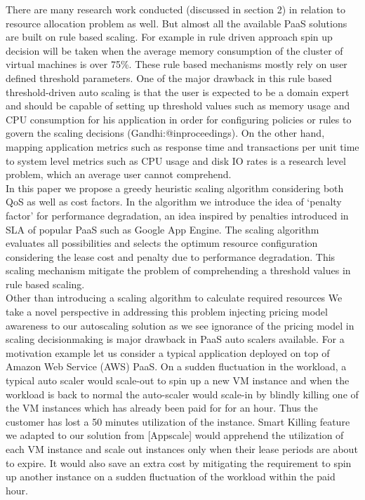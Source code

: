 There are many research work conducted (discussed in section 2) in relation to resource allocation problem as well. But almost all the available PaaS solutions are built on rule based scaling. For example in rule driven approach spin up decision will be taken when the average memory consumption of the cluster of virtual machines is over 75\%. These rule based mechanisms mostly rely on user defined threshold parameters. One of the major drawback in this rule based threshold-driven auto scaling is that the user is expected to be a domain expert and should be capable of setting up threshold values such as memory usage and CPU consumption for his application in order for configuring policies or rules to govern the scaling decisions (Gandhi:@inproceedings). On the other hand, mapping application metrics such as response time and transactions per unit time to system level metrics such as CPU usage and disk IO rates is a research level problem, which an average user cannot comprehend. \\

In this paper we propose a greedy heuristic scaling algorithm considering both QoS as well as cost factors. In the algorithm we introduce the idea of ‘penalty factor’ for performance degradation, an idea inspired by penalties introduced in SLA of popular PaaS such as Google App Engine. The scaling algorithm evaluates all possibilities and selects the optimum resource configuration considering the lease cost and penalty due to performance degradation. This scaling mechanism mitigate the problem of comprehending a threshold values in rule based scaling. \\

Other than introducing a scaling algorithm to calculate  required resources We take a novel perspective in addressing this problem injecting pricing model awareness to our autoscaling solution as we see ignorance of the pricing model in scaling decisionmaking  is major drawback in PaaS auto scalers available. For a motivation example let us consider a typical application deployed on top of Amazon Web Service (AWS) PaaS. On a sudden fluctuation in the workload, a typical auto scaler would scale-out to spin up a new VM instance and when the workload is back to normal the auto-scaler would scale-in by blindly killing one of the VM instances which has already been paid for for an hour. Thus the customer has lost a 50 minutes utilization of the instance. Smart Killing feature we adapted to our solution from [Appscale] would apprehend the utilization of each VM instance and scale out instances only when their lease periods are about to expire. It would also save an extra cost by mitigating the requirement to spin up another instance on a sudden fluctuation of the workload within the paid hour. \\

